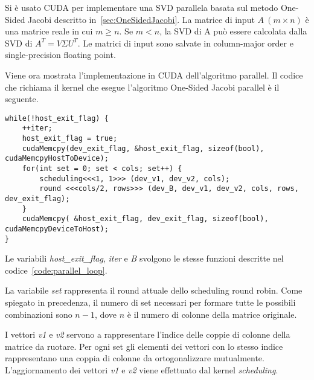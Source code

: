Si è usato CUDA per implementare una SVD parallela basata sul metodo One-Sided Jacobi descritto in~\ref{sec:OneSidedJacobi}. La matrice di input $A~(m \times n)$ è una matrice reale in cui $m \geq n$. Se $m < n$, la SVD di A può essere calcolata dalla SVD di $A^T = V \Sigma U^T$. Le matrici di input sono salvate in column-major order e single-precision floating point. \cite{Romer:SVD}

Viene ora mostrata l'implementazione in CUDA dell'algoritmo parallel. Il codice che richiama il kernel che esegue l'algoritmo One-Sided Jacobi parallel è il seguente.
\begin{lstlisting}[caption=Loop algoritmo parallelo,label=code:parallel_loop]
while(!host_exit_flag) {
	++iter;
	host_exit_flag = true; 
	cudaMemcpy(dev_exit_flag, &host_exit_flag, sizeof(bool), cudaMemcpyHostToDevice);
	for(int set = 0; set < cols; set++) {
		scheduling<<<1, 1>>> (dev_v1, dev_v2, cols);
		round <<<cols/2, rows>>> (dev_B, dev_v1, dev_v2, cols, rows, dev_exit_flag);		
	}
	cudaMemcpy( &host_exit_flag, dev_exit_flag, sizeof(bool), cudaMemcpyDeviceToHost);
}
\end{lstlisting}
Le variabili \textit{host\_exit\_flag}, \textit{iter} e \textit{B} svolgono le stesse funzioni descritte nel codice~\ref{code:parallel_loop}.

La variabile \textit{set} rappresenta il round attuale dello scheduling round robin. Come spiegato in precedenza, il numero di set necessari per formare tutte le possibili combinazioni sono $n-1$, dove $n$ è il numero di colonne della matrice originale.

I vettori \textit{v1} e  \textit{v2} servono a rappresentare l'indice delle coppie di colonne della matrice da ruotare. Per ogni set gli elementi dei vettori con lo stesso indice rappresentano una coppia di colonne da ortogonalizzare mutualmente. L'aggiornamento dei vettori \textit{v1} e  \textit{v2} viene effettuato dal kernel \textit{scheduling}.

